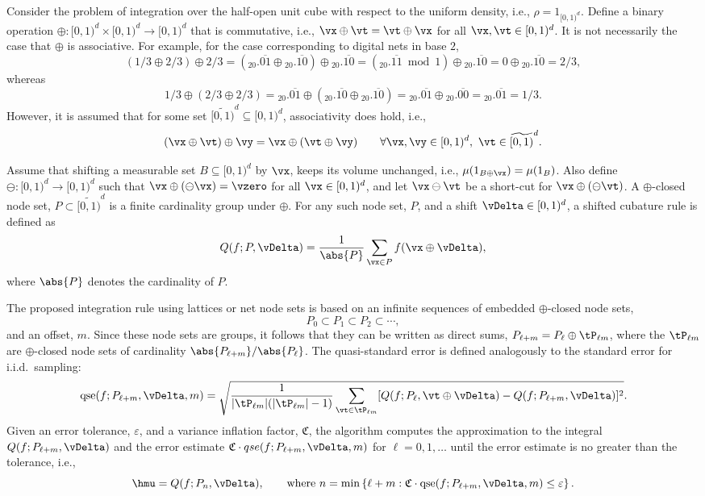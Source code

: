 \documentclass[graybox]{svmult}
\newcommand{\cube}{[0,1)^d}
\newcommand{\tcube}{\widetilde{[0,1)}^d}
\newcommand{\fudge}{\mathfrak{C}}
\DeclareMathOperator{\qse}{qse}
\begin{document}
Consider the problem of integration over the half-open unit cube with respect to the uniform density, i.e., $\rho=1_{\cube}$.  Define a binary operation $\oplus : \cube \times \cube \to \cube$ that is commutative, i.e., $\vx \oplus \vt = \vt \oplus \vx$ for all $\vx, \vt \in \cube$.  It is not necessarily the case that $\oplus$ is associative.  For example, for the case corresponding to digital nets in base $2$,
\[
(1/3 \oplus 2/3) \oplus 2/3 = ({}_20.\overline{01} \oplus {}_20.\overline{10}) \oplus {}_20.\overline{10} = ({}_20.\overline{11} \bmod 1)  \oplus {}_20.\overline{10} = 0 \oplus {}_20.\overline{10}=2/3,
\]
whereas
\[
1/3 \oplus (2/3 \oplus 2/3) = {}_20.\overline{01} \oplus ({}_20.\overline{10} \oplus {}_20.\overline{10}) = {}_20.\overline{01} \oplus {}_20.\overline{00} = {}_20.\overline{01}=1/3.
\]
However, it is assumed that for some set $\tcube \subseteq \cube$, associativity does hold, i.e., 
\[
(\vx \oplus \vt) \oplus \vy = \vx \oplus (\vt \oplus \vy) \qquad \forall \vx,\vy \in \cube,\ \vt \in \tcube.
\]


Assume that shifting a measurable set $B \subseteq \cube$ by $\vx$, keeps its volume unchanged, i.e., $\mu(1_{B \oplus {\vx}}) = \mu(1_{B})$.  Also define $\ominus: \cube \to \cube$ such that $\vx \oplus (\ominus \vx) = \vzero$ for all $\vx \in \cube$, and let $\vx \ominus \vt$ be a short-cut for $\vx \oplus (\ominus \vt)$.  
A $\oplus$-closed node set, $P \subset \tcube$ is a finite cardinality group under $\oplus$.  For any such node set, $P$, and a shift $\vDelta \in \cube$, a shifted cubature rule is defined as 
\[
Q(f;P,\vDelta) = \frac{1}{\abs{P}}\sum_{\vx \in P} f(\vx \oplus \vDelta),
\]
where $\abs{P}$ denotes the cardinality of $P$.  

The proposed integration rule using lattices or net node sets is based on an infinite sequences of embedded $\oplus$-closed node sets, 
\begin{equation} \label{embeddedsets}
P_0 \subset P_1 \subset P_2 \subset \cdots,
\end{equation}
and an offset, $m$.  Since these node sets are groups, it follows that they can be written as direct sums, $P_{\ell+m} = P_{\ell} \oplus \tP_{\ell m}$, where the $\tP_{\ell m}$ are $\oplus$-closed node sets of cardinality $\abs{P_{\ell+m}}/\abs{P_{\ell}}$.  The quasi-standard error is defined analogously to the standard error for i.i.d.\ sampling:
\begin{equation} \label{qsedef}
\qse(f;P_{\ell+m},\vDelta,m) = \sqrt{\frac{1}{\lvert\tP_{\ell m}\rvert  (\lvert\tP_{\ell m}\rvert -1)} \sum_{\vt \in \tP_{\ell m}}  [Q(f;P_{\ell},\vt\oplus\vDelta) - Q(f;P_{\ell+m},\vDelta)]^2}.
\end{equation}
Given an error tolerance, $\varepsilon$, and a variance inflation factor, $\fudge$, the algorithm computes the approximation to the integral $Q(f;P_{\ell+m},\vDelta)$ and the error estimate $\fudge \cdot qse(f;P_{\ell+m},\vDelta,m)$ for $\ell=0, 1, \ldots$ until the error estimate is no greater than the tolerance, i.e.,
\begin{equation} \label{qsealg}
\hmu=Q(f;P_n,\vDelta), \qquad \text{where } n=\min \left \{\ell+m : \fudge \cdot \qse(f;P_{\ell+m},\vDelta,m) \le \varepsilon \right\}.
\end{equation}
\end{document}

